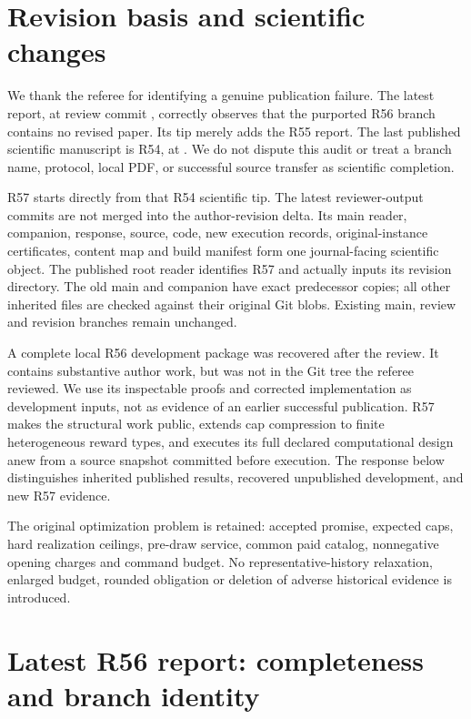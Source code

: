 \section*{Revision basis and scientific changes}
We thank the referee for identifying a genuine publication failure. The latest report, at review commit , correctly observes that the purported R56 branch contains no revised paper. Its tip  merely adds the R55 report. The last published scientific manuscript is R54, at . We do not dispute this audit or treat a branch name, protocol, local PDF, or successful source transfer as scientific completion.

R57 starts directly from that R54 scientific tip. The latest reviewer-output commits are not merged into the author-revision delta. Its main reader, companion, response, source, code, new execution records, original-instance certificates, content map and build manifest form one journal-facing scientific object. The published root reader identifies R57 and actually inputs its revision directory. The old main and companion have exact predecessor copies; all other inherited files are checked against their original Git blobs. Existing main, review and revision branches remain unchanged.

A complete local R56 development package was recovered after the review. It contains substantive author work, but was not in the Git tree the referee reviewed. We use its inspectable proofs and corrected implementation as development inputs, not as evidence of an earlier successful publication. R57 makes the structural work public, extends cap compression to finite heterogeneous reward types, and executes its full declared computational design anew from a source snapshot committed before execution. The response below distinguishes inherited published results, recovered unpublished development, and new R57 evidence.

The original optimization problem is retained: accepted promise, expected caps, hard realization ceilings, pre-draw service, common paid catalog, nonnegative opening charges and command budget. No representative-history relaxation, enlarged budget, rounded obligation or deletion of adverse historical evidence is introduced.

\section{Latest R56 report: completeness and branch identity}
